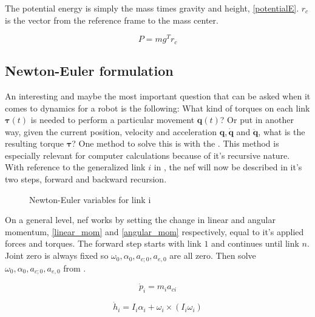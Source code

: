The potential energy is simply the mass times gravity and height, \eqref{potentialE}. $r_c$ is the vector from the reference frame to the mass center.

\begin{equation}\label{potentialE}
P = mg^Tr_c
\end{equation}



\subsection{Newton-Euler formulation}

An interesting and maybe the most important question that can be asked when it comes to dynamics for a robot is the following: What kind of torques on each link $\mathbf{\tau}(t)$ is needed to perform a particular movement $\mathbf{q}(t)$? Or put in another way, given the current position, velocity and acceleration $\mathbf{q}, \mathbf{\dot{q}}$ and $ \mathbf{\ddot{q}}$, what is the resulting torque $\mathbf{\tau}$? One method to solve this is with the . This method is especially relevant for computer calculations because of it's recursive nature. With reference to the generalized link $i$ in , the  \gls{nef} will now be described in it's two steps, forward and backward recursion.

\begin{figure}[h!]    
    \centering           
    \def\svgwidth{\columnwidth}
    
    \caption{Newton-Euler variables for link i}
    \label{newtonEuler}
\end{figure}

On a general level, \gls{nef} works by setting the change in linear and angular momentum, \eqref{linear_mom} and \eqref{angular_mom} respectively, equal to it's applied forces and torques. The forward step starts with link $1$ and continues until link $n$. Joint zero is always fixed so $\omega_0, \alpha_0, a_{c;0}, a_{e,0}$ are all zero. Then solve $\omega_0, \alpha_0, a_{c;0}, a_{e,0}$ from .

\begin{equation}\label{linear_mom}
\dot{p}_i = m_i a_{ci}
\end{equation}

\begin{equation}\label{angular_mom}
\dot{h}_i = I_i \alpha_i + \omega_i \times \left ( I_i \omega_i \right )
\end{equation}

